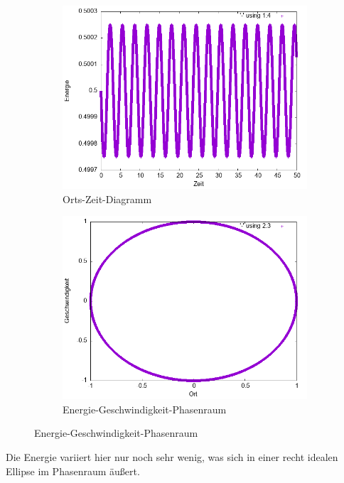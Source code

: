 \documentclass[
    oneside,
    ngerman,
    footinclude=false,
    captions=tableheading,
    DIV=12
]{scrartcl}
\begin{document}
                \begin{figure}[H]
                \centering
                \begin{subfigure}[b]{0.45\textwidth}
                    \centering
                    \includegraphics[width=\textwidth]{Bilddateien/expEulerA1(a)-0001-E.png}
                    \caption{Orts-Zeit-Diagramm}
                    \label{fig:expEulerA1(a)-0001-0-E}
                \end{subfigure}
                \hfill
                \begin{subfigure}[b]{0.45\textwidth}
                    \centering
                    \includegraphics[width=\textwidth]{Bilddateien/expEulerA1(a)-0001-0-xv.png}
                    \caption{Energie-Geschwindigkeit-Phasenraum}
                    \label{fig:expEulerA1(a)-0001-0-xv}
                \end{subfigure}
            \end{figure}
            Die Energie variiert hier nur noch sehr wenig, was sich in einer recht idealen Ellipse im Phasenraum äußert.
            \newpage
\end{document}

